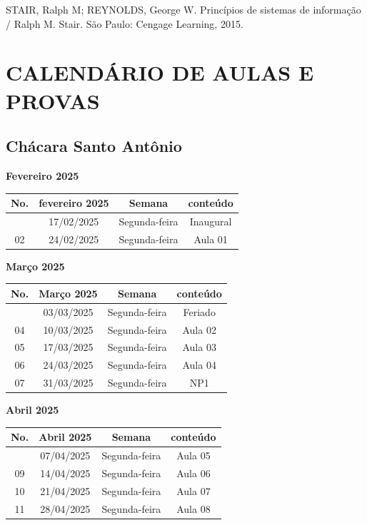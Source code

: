 \documentclass[
]{book}
\begin{document}
STAIR, Ralph M; REYNOLDS, George W. Princípios de sistemas de informação / Ralph M. Stair. São Paulo: Cengage Learning, 2015.

\section{CALENDÁRIO DE AULAS E PROVAS}\label{calenduxe1rio-de-aulas-e-provas}

\subsection{Chácara Santo Antônio}\label{chuxe1cara-santo-antuxf4nio}

\textbf{Fevereiro 2025}

\begin{longtable}[]{@{}cccc@{}}
\toprule\noalign{}
No. & fevereiro 2025 & Semana & conteúdo \\
\midrule\noalign{}
\endhead
\bottomrule\noalign{}
\endlastfoot
01 & 17/02/2025 & Segunda-feira & Inaugural \\
02 & 24/02/2025 & Segunda-feira & Aula 01 \\
\end{longtable}

\textbf{Março 2025}

\begin{longtable}[]{@{}cccc@{}}
\toprule\noalign{}
No. & Março 2025 & Semana & conteúdo \\
\midrule\noalign{}
\endhead
\bottomrule\noalign{}
\endlastfoot
03 & 03/03/2025 & Segunda-feira & Feriado \\
04 & 10/03/2025 & Segunda-feira & Aula 02 \\
05 & 17/03/2025 & Segunda-feira & Aula 03 \\
06 & 24/03/2025 & Segunda-feira & Aula 04 \\
07 & 31/03/2025 & Segunda-feira & NP1 \\
\end{longtable}

\textbf{Abril 2025}

\begin{longtable}[]{@{}cccc@{}}
\toprule\noalign{}
No. & Abril 2025 & Semana & conteúdo \\
\midrule\noalign{}
\endhead
\bottomrule\noalign{}
\endlastfoot
08 & 07/04/2025 & Segunda-feira & Aula 05 \\
09 & 14/04/2025 & Segunda-feira & Aula 06 \\
10 & 21/04/2025 & Segunda-feira & Aula 07 \\
11 & 28/04/2025 & Segunda-feira & Aula 08 \\
\end{longtable}
\end{document}
